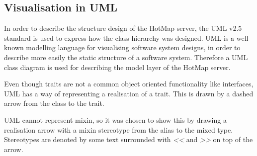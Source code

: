 \subsection{Visualisation in UML}
In order to describe the structure design of the HotMap server, the UML v2.5 standard is used to express how the class hierarchy was designed. UML is a well known modelling language for visualising software system designs, in order to describe more easily the static structure of a software system. Therefore a UML class diagram is used for describing the model layer of the HotMap server.

Even though traits are not a common object oriented functionality like interfaces, UML has a way of representing a realisation of a trait. This is drawn by a dashed arrow from the class to the trait.

UML cannot represent mixin, so it was chosen to show this by drawing a realisation arrow with a mixin stereotype from the alias to the mixed type. Stereotypes are denoted by some text surrounded with \emph{<<} and \emph{>>} on top of the arrow. 